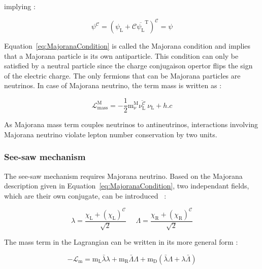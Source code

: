 \documentclass[main.tex]{subfiles}
\begin{document}
\NI implying : 


\begin{equation}\label{eq:MajoranaCondition}
\psi^\mathcal{C} = (\psi_\text{L} +  \mathcal{C} \overline{\psi_\text{L}}^\text{T})^\mathcal{C} = \psi
\end{equation}


\NI Equation~\ref{eq:MajoranaCondition} is called the Majorana condition and implies that a Majorana particle is its own antiparticle. This condition can only be satisfied by a neutral particle since the charge conjugaison opertor flips the sign of the electric charge. The only fermions that can be Majorana particles are neutrinos. In case of Majorana neutrino, the term mass is written as :  


\begin{equation}
\mathcal{L}_{\text{mass}}^\text{M} = - \frac{\text{1}}{\text{2}} \text{m}_\nu^{\text{M}} \overline{\nu_\text{L}^{\mathcal{C}}}~\nu_\text{L} + h.c
\end{equation}


\NI As Majorana mass term couples neutrinos to antineutrinos, interactions involving Majorana neutrino violate lepton number conservation by two units.




\subsubsection{See-saw mechanism}


\NI The see-saw mechanism requires Majorana neutrino. Based on the Majorana description given in Equation~\ref{eq:MajoranaCondition}, two independant fields, which are their own conjugate, can be introduced~\cite{SchechterValle,SeeSawMechanism} : 


\begin{equation}\label{eq:DefinitionSeftConjugateField}
\lambda = \frac{\chi_\text{L} + (\chi_\text{L})^\mathcal{C}}{\sqrt{\text{2}}} ~~~~~~ \Lambda = \frac{\chi_\text{R} + (\chi_\text{R})^\mathcal{C}}{\sqrt{\text{2}}}
\end{equation}


\NI The mass term in the Lagrangian can be written in its more general form : 


\begin{equation}
-\mathcal{L}_\text{m} = \text{m}_\text{L} \bar{\lambda} \lambda + \text{m}_\text{R} \bar{\Lambda} \Lambda + \text{m}_\text{D} (\bar{\lambda} \Lambda + \lambda \bar{\Lambda})
\end{equation}
\end{document}
